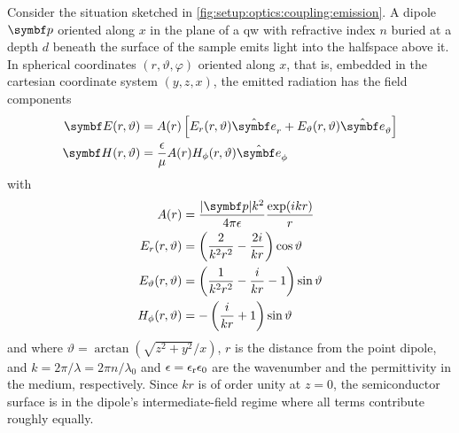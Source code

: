 Consider the situation sketched in \cref{fig:setup:optics:coupling:emission}.
A dipole $\bvec{p}$ oriented along $x$ in the plane of a  \gls{qw} with refractive index $n$ buried at a depth $d$ beneath the surface of the sample emits light into the halfspace above it.
In spherical coordinates $(r, \vartheta, \varphi)$ oriented along $x$, that is, embedded in the cartesian coordinate system $(y, z, x)$, the emitted radiation has the field components~\cite{Griffiths2017}
\begin{align}
    \bvec{E}(r, \vartheta) &= A(r)\left[E_r(r, \vartheta)\ubvec{r} + E_{\vartheta}(r, \vartheta)\ubvec{\vartheta}\right] \label{eq:setup:optics:coupling:dipole:efield}\\
    \bvec{H}(r, \vartheta) &= \frac{\epsilon}{\mu} A(r) H_{\phi}(r, \vartheta)\ubvec{\phi} \label{eq:setup:optics:coupling:dipole:hfield}
\end{align}
with
\begin{align}
    A(r) &= \frac{\abs{\bvec{p}}k^2}{4\pi\epsilon}\frac{\exp(\i k r)}{r} \\
    E_r(r, \vartheta) &= \left(\frac{2}{k^2 r^2} - \frac{2\i}{k r}\right)\cos\vartheta \\
    E_{\vartheta}(r, \vartheta) &= \left(\frac{1}{k^2 r^2} - \frac{\i}{k r} - 1\right)\sin\vartheta \\
    H_{\phi}(r, \vartheta) &= -\left(\frac{\i}{k r} + 1\right)\sin\vartheta
\end{align}
and where $\vartheta=\arctan\left(\sqrt{z^2 + y^2}/x\right)$, $r$ is the distance from the point dipole, and $k=2\pi/\lambda=2\pi n/\lambda_0$ and $\epsilon=\epsilon_{\mathrm{r}}\epsilon_0$ are the wavenumber and the permittivity in the medium, respectively.
Since $kr$ is of order unity at $z=0$, the semiconductor surface is in the dipole's intermediate-field regime where all terms contribute roughly equally.

